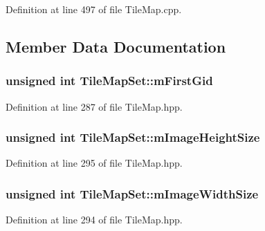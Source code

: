 Definition at line 497 of file Tile\-Map.\-cpp.



\subsection{Member Data Documentation}
\hypertarget{class_tile_map_set_aa30770be0b41115d5267c288c980d967}{
\subsubsection[{m\-First\-Gid}]{\setlength{\rightskip}{0pt plus 5cm}unsigned int Tile\-Map\-Set\-::m\-First\-Gid\hspace{0.3cm}{\ttfamily [protected]}}}\label{class_tile_map_set_aa30770be0b41115d5267c288c980d967}


Definition at line 287 of file Tile\-Map.\-hpp.

\hypertarget{class_tile_map_set_abf6e23ffe5ce47b8d25bd7e24e8bf386}{
\subsubsection[{m\-Image\-Height\-Size}]{\setlength{\rightskip}{0pt plus 5cm}unsigned int Tile\-Map\-Set\-::m\-Image\-Height\-Size\hspace{0.3cm}{\ttfamily [protected]}}}\label{class_tile_map_set_abf6e23ffe5ce47b8d25bd7e24e8bf386}


Definition at line 295 of file Tile\-Map.\-hpp.

\hypertarget{class_tile_map_set_ad70411018be2b8ce950e00b70020c703}{
\subsubsection[{m\-Image\-Width\-Size}]{\setlength{\rightskip}{0pt plus 5cm}unsigned int Tile\-Map\-Set\-::m\-Image\-Width\-Size\hspace{0.3cm}{\ttfamily [protected]}}}\label{class_tile_map_set_ad70411018be2b8ce950e00b70020c703}


Definition at line 294 of file Tile\-Map.\-hpp.

